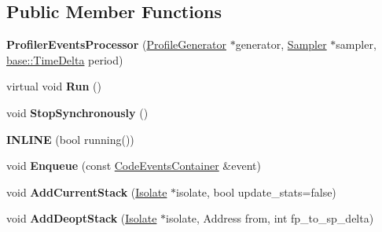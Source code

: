 \subsection*{Public Member Functions}
\begin{DoxyCompactItemize}
\item 
{\bfseries Profiler\+Events\+Processor} (\hyperlink{classv8_1_1internal_1_1_profile_generator}{Profile\+Generator} $\ast$generator, \hyperlink{classv8_1_1internal_1_1_sampler}{Sampler} $\ast$sampler, \hyperlink{classv8_1_1base_1_1_time_delta}{base\+::\+Time\+Delta} period)\hypertarget{classv8_1_1internal_1_1_profiler_events_processor_a3632b56f6515a42e5f183f9409e7c97b}{}\label{classv8_1_1internal_1_1_profiler_events_processor_a3632b56f6515a42e5f183f9409e7c97b}

\item 
virtual void {\bfseries Run} ()\hypertarget{classv8_1_1internal_1_1_profiler_events_processor_af9d1985b1e9c2d300676ac47fc50ecfe}{}\label{classv8_1_1internal_1_1_profiler_events_processor_af9d1985b1e9c2d300676ac47fc50ecfe}

\item 
void {\bfseries Stop\+Synchronously} ()\hypertarget{classv8_1_1internal_1_1_profiler_events_processor_a2c5ebee64884e9de0ca8edac68c91f5b}{}\label{classv8_1_1internal_1_1_profiler_events_processor_a2c5ebee64884e9de0ca8edac68c91f5b}

\item 
{\bfseries I\+N\+L\+I\+NE} (bool running())\hypertarget{classv8_1_1internal_1_1_profiler_events_processor_a603bac41b4c09abf8f27e53441f947e9}{}\label{classv8_1_1internal_1_1_profiler_events_processor_a603bac41b4c09abf8f27e53441f947e9}

\item 
void {\bfseries Enqueue} (const \hyperlink{classv8_1_1internal_1_1_code_events_container}{Code\+Events\+Container} \&event)\hypertarget{classv8_1_1internal_1_1_profiler_events_processor_a86cc7e6c442f57a7a545805a6cd5fecf}{}\label{classv8_1_1internal_1_1_profiler_events_processor_a86cc7e6c442f57a7a545805a6cd5fecf}

\item 
void {\bfseries Add\+Current\+Stack} (\hyperlink{classv8_1_1internal_1_1_isolate}{Isolate} $\ast$isolate, bool update\+\_\+stats=false)\hypertarget{classv8_1_1internal_1_1_profiler_events_processor_ac9805bd7893d186ffbfa31e203c6eb45}{}\label{classv8_1_1internal_1_1_profiler_events_processor_ac9805bd7893d186ffbfa31e203c6eb45}

\item 
void {\bfseries Add\+Deopt\+Stack} (\hyperlink{classv8_1_1internal_1_1_isolate}{Isolate} $\ast$isolate, Address from, int fp\+\_\+to\+\_\+sp\+\_\+delta)\hypertarget{classv8_1_1internal_1_1_profiler_events_processor_adf10ee1fe41ef2817d23546b18354dbd}{}\label{classv8_1_1internal_1_1_profiler_events_processor_adf10ee1fe41ef2817d23546b18354dbd}


\end{DoxyCompactItemize}
